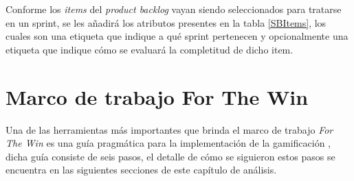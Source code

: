 \noindent Conforme los {\it items} del {\it product backlog} vayan siendo seleccionados para
 tratarse en un sprint, se les añadirá los atributos presentes en la tabla \ref{SBItems}, los
 cuales son una etiqueta que indique a qué sprint pertenecen y opcionalmente una etiqueta que
 indique cómo se evaluará la completitud de dicho item.



\section{Marco de trabajo For The Win}
\label{analisis:forthewin}

 Una de las herramientas más importantes que brinda el marco de trabajo {\it For The
 Win} es una guía pragmática para la implementación de la gamificación \cite[p. 8]%
 {ForTheWin}, dicha guía consiste de seis pasos, el detalle de cómo se siguieron 
 estos pasos se encuentra en las siguientes secciones de este capítulo de análisis.

